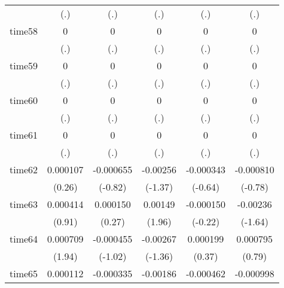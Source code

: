 \begin{table}[htbp]
\begin{tabular}{l*{5}{c}}
            &         (.)         &         (.)         &         (.)         &         (.)         &         (.)         \\
time58      &           0         &           0         &           0         &           0         &           0         \\
            &         (.)         &         (.)         &         (.)         &         (.)         &         (.)         \\
time59      &           0         &           0         &           0         &           0         &           0         \\
            &         (.)         &         (.)         &         (.)         &         (.)         &         (.)         \\
time60      &           0         &           0         &           0         &           0         &           0         \\
            &         (.)         &         (.)         &         (.)         &         (.)         &         (.)         \\
time61      &           0         &           0         &           0         &           0         &           0         \\
            &         (.)         &         (.)         &         (.)         &         (.)         &         (.)         \\
time62      &    0.000107         &   -0.000655         &    -0.00256         &   -0.000343         &   -0.000810         \\
            &      (0.26)         &     (-0.82)         &     (-1.37)         &     (-0.64)         &     (-0.78)         \\
time63      &    0.000414         &    0.000150         &     0.00149\sym{*}  &   -0.000150         &    -0.00236         \\
            &      (0.91)         &      (0.27)         &      (1.96)         &     (-0.22)         &     (-1.64)         \\
time64      &    0.000709         &   -0.000455         &    -0.00267         &    0.000199         &    0.000795         \\
            &      (1.94)         &     (-1.02)         &     (-1.36)         &      (0.37)         &      (0.79)         \\
time65      &    0.000112         &   -0.000335         &    -0.00186         &   -0.000462         &   -0.000998         \\

\end{tabular}
\end{table}
